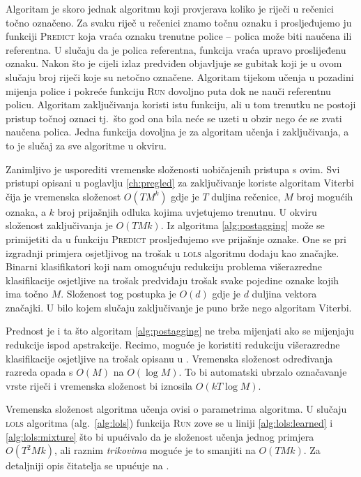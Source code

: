Algoritam je skoro jednak algoritmu koji provjerava koliko je riječi u rečenici
točno označeno. Za svaku riječ u rečenici znamo točnu oznaku i prosljeđujemo ju
funkciji \textsc{Predict} koja vraća oznaku trenutne police -- polica može biti
naučena ili referentna. U slučaju da je polica referentna, funkcija vraća upravo
proslijeđenu oznaku. Nakon što je cijeli izlaz predviđen objavljuje se gubitak
koji je u ovom slučaju broj riječi koje su netočno označene. Algoritam tijekom
učenja u pozadini mijenja police i pokreće funkciju \textsc{Run} dovoljno puta
dok ne nauči referentnu policu. Algoritam zaključivanja koristi istu funkciju,
ali u tom trenutku ne postoji pristup točnoj oznaci tj.~što god ona bila neće se
uzeti u obzir nego će se zvati naučena polica. Jedna funkcija dovoljna je za
algoritam učenja i zaključivanja, a to je slučaj za sve algoritme u \lts{}
okviru.

Zanimljivo je usporediti vremenske složenosti uobičajenih pristupa s ovim. Svi
pristupi opisani u poglavlju \ref{ch:pregled} za zaključivanje koriste algoritam
Viterbi čija je vremenska složenost $O(T M ^ k)$ gdje je $T$ duljina rečenice,
$M$ broj mogućih oznaka, a $k$ broj prijašnjih odluka kojima uvjetujemo
trenutnu. U \lts{} okviru složenost zaključivanja je $O(T M k)$. Iz algoritma
\ref{alg:postagging} može se primijetiti da u funkciju \textsc{Predict}
prosljeđujemo  sve prijašnje oznake. One se pri izgradnji primjera osjetljivog
na trošak u \textsc{lols} algoritmu dodaju kao značajke. Binarni klasifikatori
koji nam omogućuju redukciju problema višerazredne klasifikacije osjetljive na
trošak predviđaju trošak svake pojedine oznake kojih ima točno $M$. Složenost
tog postupka je $O(d)$ gdje je $d$ duljina vektora značajki. U bilo kojem
slučaju zaključivanje je puno brže nego algoritam Viterbi.

Prednost je i ta što algoritam \ref{alg:postagging} ne treba mijenjati ako se
mijenjaju redukcije ispod apstrakcije. Recimo, moguće je koristiti redukciju
višerazredne klasifikacije osjetljive na trošak opisanu u
\citep{beygelzimer2009error, daume2016one}. Vremenska složenost određivanja
razreda opada s $O(M)$ na $O(\log M)$. To bi automatski ubrzalo označavanje
vrste riječi i vremenska složenost bi iznosila $O(k T \log M)$.

Vremenska složenost algoritma učenja ovisi o parametrima algoritma. U slučaju
\textsc{lols} algoritma (alg.~\ref{alg:lols}) funkcija \textsc{Run} zove se u
liniji \ref{alg:lols:learned} i \ref{alg:lols:mixture} što bi upućivalo da je
složenost učenja jednog primjera $O(T ^ 2 M k)$, ali raznim \textit{trikovima}
moguće je to smanjiti na $O(T M k)$. Za detaljniji opis čitatelja se upućuje na
\citep{daume14lts}.


